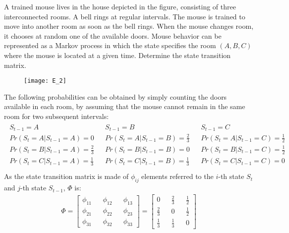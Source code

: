 \Exercise[number={3}]
A trained mouse lives in the house depicted in the figure, consisting of
three interconnected rooms. A bell rings at regular intervals. The mouse is
trained to move into another room as soon as the bell rings.
When the mouse changes room, it chooses at random one of the available doors.
Mouse behavior can be represented as a Markov process in which the state
specifies the room \((A, B, C)\) where the mouse is located at a given time.
Determine the state transition matrix.
\begin{figure}[H]
    \texttt{[image: E\_2]}
    \centering
\end{figure}

\Answer[number={3}]
The following probabilities can be obtained by simply counting the doors
available in each room, by assuming that the mouse cannot remain in the
same room for two subsequent intervals:
\begin{align*}
    \begin{matrix}
        S_{t-1}=A && S_{t-1}=B && S_{t-1}=C\\
        Pr(S_{t}=A|S_{t-1}=A)=0 && Pr(S_{t}=A|S_{t-1}=B)=\frac{2}{3} && Pr(S_{t}=A|S_{t-1}=C)=\frac{1}{2}\\
        Pr(S_{t}=B|S_{t-1}=A)=\frac{2}{3} && Pr(S_{t}=B|S_{t-1}=B)=0 && Pr(S_{t}=B|S_{t-1}=C)=\frac{1}{2}\\
        Pr(S_{t}=C|S_{t-1}=A)=\frac{1}{3} && Pr(S_{t}=C|S_{t-1}=B)=\frac{1}{3} && Pr(S_{t}=C|S_{t-1}=C)=0\\
    \end{matrix}
\end{align*}
As the state transition matrix is made of \(\phi_{ij}\) elements referred to
the \(i\)-th state \(S_{t}\) and \(j\)-th state \(S_{t-1}\), \(\Phi\) is:
\begin{align*}
    \Phi=
    \begin{bmatrix}
        \phi_{11} && \phi_{12} && \phi_{13}\\
        \phi_{21} && \phi_{22} && \phi_{23}\\
        \phi_{31} && \phi_{32} && \phi_{33}
    \end{bmatrix}
    =
    \begin{bmatrix}
        0 && \frac{2}{3} && \frac{1}{2}\\
        \frac{2}{3} && 0 && \frac{1}{2}\\
        \frac{1}{3} && \frac{1}{3} && 0
    \end{bmatrix}
\end{align*}
